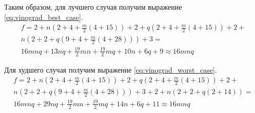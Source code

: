 \documentclass[a4paper,oneside,14pt]{extreport}
\begin{document}
\begin{itemize}
\begin{itemize}
	\end{itemize}
\end{itemize}

Таким образом, для лучшего случая получим выражение \ref{eq:vinograd_best_case}.
\begin{equation} \label{eq:vinograd_best_case}
\begin{array}{ll}
f = 2 + n(2 + 4 + \frac{m}{2}(4 + 15)) + 2 + q(2 + 4 + \frac{m}{2}(4 + 15)) + 2 + \\
n(2 + 2 + q(9 + 4 + \frac{m}{2}(4 + 28))) + 3 = \\
16mnq + 13nq + \frac{19}{2}mn + \frac{19}{2}mq + 10n + 6q + 9 \approx 16 mnq
\end{array}
\end{equation}

Для худшего случая получим выражение \ref{eq:vinograd_worst_case}.
\begin{equation} \label{eq:vinograd_worst_case}
\begin{array}{ll}
f = 2 + n(2 + 4 + \frac{m}{2}(4 + 15)) + 2 + q(2 + 4 + \frac{m}{2}(4 + 15)) + 2 + \\
n(2 + 2 + q(9 + 4 + \frac{m}{2}(4 + 28))) + 3 + 2 + n(2 + 2 + q(2 + 14))= \\ 16mnq + 29nq + \frac{19}{2}mn + \frac{19}{2}mq + 14n + 6q + 11 \approx 16 mnq
\end{array}
\end{equation}
\end{document}
